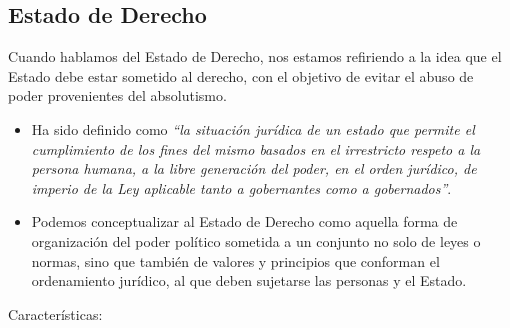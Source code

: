 \documentclass{templateApunte}
\begin{document}
\subsection{Estado de Derecho}
Cuando hablamos del Estado de Derecho, nos estamos refiriendo a la idea que el Estado debe estar sometido al derecho, con el objetivo de evitar el abuso de poder provenientes del absolutismo.
\begin{itemize}
  \item Ha sido definido como \textit{``la situación jurídica de un estado que permite el cumplimiento de los fines del mismo basados en el irrestricto respeto a la persona humana, a la libre generación del poder, en el orden jurídico, de imperio de la Ley aplicable tanto a gobernantes como a gobernados''}.
  \item Podemos conceptualizar al Estado de Derecho como aquella forma de organización del poder político sometida a un conjunto no solo de leyes o normas, sino que también de valores y principios que conforman el ordenamiento jurídico, al que deben sujetarse las personas y el Estado.
\end{itemize}
Características:
\end{document}
